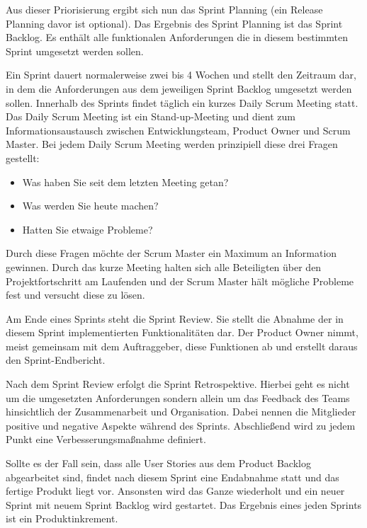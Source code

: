 Aus dieser Priorisierung ergibt sich nun das Sprint Planning (ein Release Planning davor ist optional). Das Ergebnis des Sprint Planning ist das Sprint Backlog. Es enthält alle funktionalen Anforderungen die in diesem bestimmten Sprint umgesetzt werden sollen.

Ein Sprint dauert normalerweise zwei bis 4 Wochen und stellt den Zeitraum dar, in dem die Anforderungen aus dem jeweiligen Sprint Backlog umgesetzt werden sollen. Innerhalb des Sprints findet täglich ein kurzes Daily Scrum Meeting statt. Das Daily Scrum Meeting ist ein Stand-up-Meeting und dient zum Informationsaustausch zwischen Entwicklungsteam, Product Owner und Scrum Master. Bei jedem Daily Scrum Meeting werden prinzipiell diese drei Fragen gestellt:
\begin{itemize}
\item Was haben Sie seit dem letzten Meeting getan?
\item Was werden Sie heute machen?
\item Hatten Sie etwaige Probleme?
\end{itemize}

Durch diese Fragen möchte der Scrum Master ein Maximum an Information gewinnen. Durch das kurze Meeting halten sich alle Beteiligten über den Projektfortschritt am Laufenden und der Scrum Master hält mögliche Probleme fest und versucht diese zu lösen.

Am Ende eines Sprints steht die Sprint Review. Sie stellt die Abnahme der in diesem Sprint implementierten Funktionalitäten dar. Der Product Owner nimmt, meist gemeinsam mit dem Auftraggeber, diese Funktionen ab und erstellt daraus den Sprint-Endbericht.

Nach dem Sprint Review erfolgt die Sprint Retrospektive. Hierbei geht es nicht um die umgesetzten Anforderungen sondern allein um das Feedback des Teams hinsichtlich der Zusammenarbeit und Organisation. Dabei nennen die Mitglieder positive und negative Aspekte während des Sprints. Abschließend wird zu jedem Punkt eine Verbesserungsmaßnahme definiert.

Sollte es der Fall sein, dass alle User Stories aus dem Product Backlog abgearbeitet sind, findet nach diesem Sprint eine Endabnahme statt und das fertige Produkt liegt vor. Ansonsten wird das Ganze wiederholt und ein neuer Sprint mit neuem Sprint Backlog wird gestartet. Das Ergebnis eines jeden Sprints ist ein Produktinkrement.


